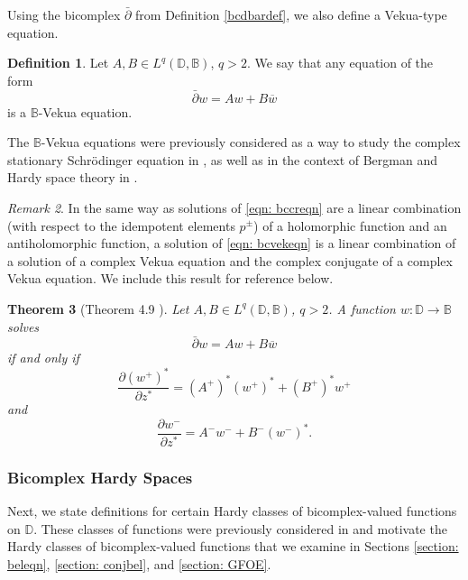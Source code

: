 \documentclass[12pt,reqno]{amsart}
\newtheorem{theorem}{Theorem}[section]
\theoremstyle{definition}
\newtheorem{deff}[theorem]{Definition}
\theoremstyle{remark}
\newtheorem{comm}[theorem]{Remark}
\newcommand{\p}{\partial}
\newcommand{\dbar}{\bar\partial}
\newcommand{\bc}{\mathbb{B}}
\newcommand{\disk}{\mathbb{D}}
\begin{document}
        Using the bicomplex $\dbar$ from Definition \ref{bcdbardef}, we also define a Vekua-type equation. 

        \begin{deff}
            Let $A, B \in L^q(\disk,\bc)$, $q>2$. We say that any equation of the form 
            \begin{equation}\label{eqn: bcvekeqn}
                \dbar w = Aw + B\overline{w}
            \end{equation}
            is a $\bc$-Vekua equation. 
        \end{deff}

        The $\bc$-Vekua equations were previously considered as a way to study the complex stationary Schr\"odinger equation in \cite{CastaKrav, BCTransmutation, FundBicomplex, KravAPFT, ComplexSchr}, as well as in the context of Bergman and Hardy space theory in \cite{BCTransmutation, BCBergman, BCHoiv}.

        \begin{comm}
            In the same way as solutions of \eqref{eqn: bccreqn} are a linear combination (with respect to the idempotent elements $p^\pm$) of a holomorphic function and an antiholomorphic function, a solution of \eqref{eqn: bcvekeqn} is a linear combination of a solution of a complex Vekua equation and the complex conjugate of a complex Vekua equation. We include this result for reference below.
        \end{comm}

        \begin{theorem}[Theorem 4.9 \cite{BCHoiv}]\label{bcvekimpliescvek}
            Let $A, B \in L^q(\disk,\bc)$, $q>2$. A function $w:\disk\to\bc$ solves
\[
    \dbar w = Aw + B\overline{w}
\]
if and only if
\[
    \frac{\p (w^+)^*}{\p z^*} = (A^+)^* (w^+)^* + (B^+)^* w^+
\]
and
\[
    \frac{\p w^-}{\p z^*} = A^- w^- + B^- (w^-)^*.
\]
        \end{theorem}

        

    \subsubsection{Bicomplex Hardy Spaces}

        Next, we state definitions for certain Hardy classes of bicomplex-valued functions on $\disk$. These classes of functions were previously considered in \cite{BCAtomic, BCHoiv, BCHarmVek} and motivate the Hardy classes of bicomplex-valued functions that we examine in Sections \ref{section: beleqn}, \ref{section: conjbel}, and \ref{section: GFOE}.
\end{document}

